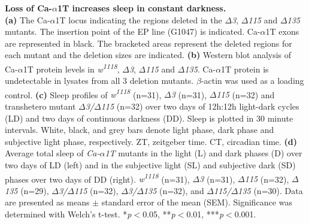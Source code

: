 \label{fig:S3}
\textbf{Loss of Ca-$\alpha$1T increases sleep in constant darkness.}
\\
\textbf{(a)} The Ca-$\alpha$1T locus indicating the regions deleted in the \emph{$\Delta$3}, \emph{$\Delta$115} and \emph{$\Delta$135} mutants.
The insertion point of the EP line (G1047) is indicated.
Ca-$\alpha$1T exons are represented in black.
The bracketed areas represent the deleted regions for each mutant and the deletion sizes are indicated.
\textbf{(b)} Western blot analysis of Ca-$\alpha$1T protein levels in \emph{w\textsuperscript{1118}}, \emph{$\Delta$3}, \emph{$\Delta$115} and \emph{$\Delta$135}.
Ca-$\alpha$1T protein is undetectable in lysates from all 3 deletion mutants.
$\beta$-actin was used as a loading control.
\textbf{(c)} Sleep profiles of \emph{w\textsuperscript{1118}} (n=31), \emph{$\Delta$3} (n=31), \emph{$\Delta$115} (n=32) and transhetero mutant \emph{$\Delta$3/$\Delta$115} (n=32) over two days of 12h:12h light-dark cycles (LD) and two days of continuous darkness (DD).
Sleep is plotted in 30 minute intervals.
White, black, and grey bars denote light phase, dark phase and subjective light phase, respectively.
ZT, zeitgeber time.
CT, circadian time.
\textbf{(d)} Average total sleep of \emph{Ca-$\alpha$1T} mutants in the light (L) and dark phases (D) over two days of LD (left) and in the subjective light (SL) and subjective dark (SD) phases over two days of DD (right).
\emph{w\textsuperscript{1118}} (n=31), \emph{$\Delta$3} (n=31), \emph{$\Delta$115} (n=32), \emph{$\Delta$135} (n=29), \emph{$\Delta$3/$\Delta$115} (n=32), \emph{$\Delta$3/$\Delta$135} (n=32), and \emph{$\Delta$115/$\Delta$135} (n=30).
Data are presented as means $\pm$ standard error of the mean (SEM).
Significance was determined with Welch's t-test.
*\emph{p}$<$0.05, **\emph{p}$<$0.01, ***\emph{p}$<$0.001.
